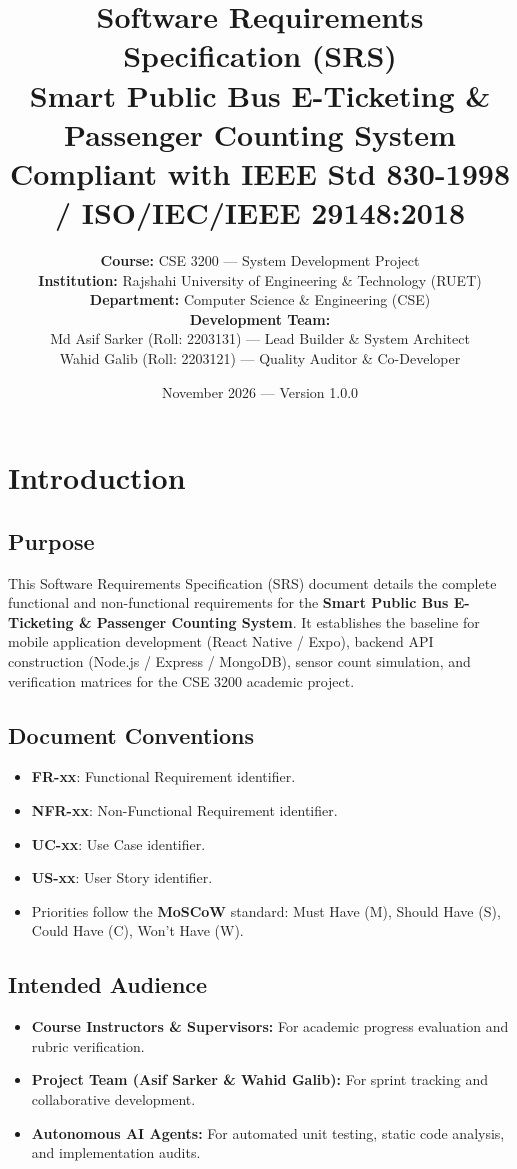 \documentclass[11pt,a4paper]{article}
\title{\textbf{Software Requirements Specification (SRS)} \\ \Large Smart Public Bus E-Ticketing \& Passenger Counting System \\ \normalsize Compliant with IEEE Std 830-1998 / ISO/IEC/IEEE 29148:2018}
\author{\textbf{Course:} CSE 3200 — System Development Project \\
\textbf{Institution:} Rajshahi University of Engineering \& Technology (RUET) \\
\textbf{Department:} Computer Science \& Engineering (CSE) \\[0.5cm]
\textbf{Development Team:} \\
Md Asif Sarker (Roll: 2203131) — Lead Builder \& System Architect \\
Wahid Galib (Roll: 2203121) — Quality Auditor \& Co-Developer}
\date{November 2026 --- Version 1.0.0}
\begin{document}
\maketitle
\newpage
\tableofcontents
\newpage

\section{Introduction}

\subsection{Purpose}
This Software Requirements Specification (SRS) document details the complete functional and non-functional requirements for the \textbf{Smart Public Bus E-Ticketing \& Passenger Counting System}. It establishes the baseline for mobile application development (React Native / Expo), backend API construction (Node.js / Express / MongoDB), sensor count simulation, and verification matrices for the CSE 3200 academic project.

\subsection{Document Conventions}
\begin{itemize}[noitemsep]
    \item \textbf{FR-xx}: Functional Requirement identifier.
    \item \textbf{NFR-xx}: Non-Functional Requirement identifier.
    \item \textbf{UC-xx}: Use Case identifier.
    \item \textbf{US-xx}: User Story identifier.
    \item Priorities follow the \textbf{MoSCoW} standard: Must Have (M), Should Have (S), Could Have (C), Won't Have (W).
\end{itemize}

\subsection{Intended Audience}
\begin{itemize}[noitemsep]
    \item \textbf{Course Instructors \& Supervisors:} For academic progress evaluation and rubric verification.
    \item \textbf{Project Team (Asif Sarker \& Wahid Galib):} For sprint tracking and collaborative development.
    \item \textbf{Autonomous AI Agents:} For automated unit testing, static code analysis, and implementation audits.
\end{itemize}
\end{document}
